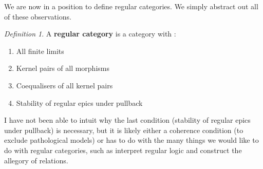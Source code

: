 \documentclass{article}
\theoremstyle{plain}
\theoremstyle{remark}
\newtheorem{defn}[theorem]{Def{i}ni{t}ion}
\begin{document}
We are now in a position to define regular categories. We simply abstract out all of these observations.

\begin{defn}
    A \textbf{regular category} \citep{borceux_1994} is a category with :
    \begin{enumerate}
        \item All finite limits 
        \item Kernel pairs of all morphisms
        \item Coequalisers of all kernel pairs 
        \item Stability of regular epics under pullback
    \end{enumerate}
\end{defn}

I have not been able to intuit why the last condition (stability of regular epics under pullback) is necessary, but it is likely either a coherence condition (to exclude pathological models) or has to do with the many things we would like to do with regular categories, such as interpret regular logic and construct the allegory of relations.



\end{document}

